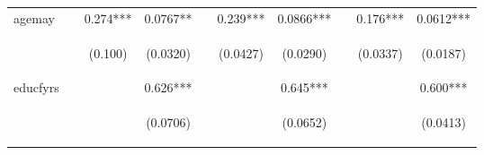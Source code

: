 \documentclass[]{article}
\begin{document}
\begin{center}
\begin{tabular}{lccccccccc}
agemay &  & 0.274*** & 0.0767** &  & 0.239*** & 0.0866*** &  & 0.176*** & 0.0612*** \\
\vspace{4pt} & \begin{footnotesize}\end{footnotesize} & \begin{footnotesize}(0.100)\end{footnotesize} & \begin{footnotesize}(0.0320)\end{footnotesize} & \begin{footnotesize}\end{footnotesize} & \begin{footnotesize}(0.0427)\end{footnotesize} & \begin{footnotesize}(0.0290)\end{footnotesize} & \begin{footnotesize}\end{footnotesize} & \begin{footnotesize}(0.0337)\end{footnotesize} & \begin{footnotesize}(0.0187)\end{footnotesize} \\
educfyrs &  &  & 0.626*** &  &  & 0.645*** &  &  & 0.600*** \\
\vspace{4pt} & \begin{footnotesize}\end{footnotesize} & \begin{footnotesize}\end{footnotesize} & \begin{footnotesize}(0.0706)\end{footnotesize} & \begin{footnotesize}\end{footnotesize} & \begin{footnotesize}\end{footnotesize} & \begin{footnotesize}(0.0652)\end{footnotesize} & \begin{footnotesize}\end{footnotesize} & \begin{footnotesize}\end{footnotesize} & \begin{footnotesize}(0.0413)\end{footnotesize} \\

\end{tabular}
\end{center}
\end{document}
